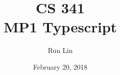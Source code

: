 \documentclass[12pt, letterpaper]{article}
\title{CS 341\\ MP1 Typescript}
\author{Run Lin}
\date{February 20, 2018}
\begin{document}
\begin{titlepage}
\maketitle
\end{titlepage}
\end{document}
